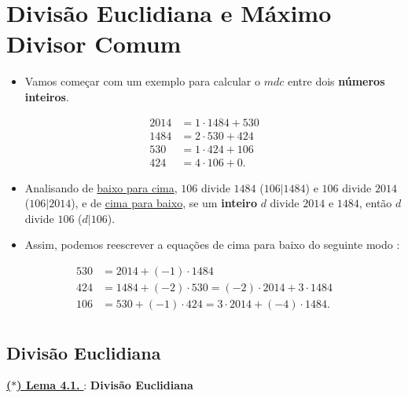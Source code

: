 \section{Divisão Euclidiana e Máximo Divisor Comum}

    \begin{itemize}[left=0.5cm, align=left, nosep]
        \item Vamos começar com um exemplo para calcular o $mdc$ entre dois \textbf{números inteiros}.  
    \end{itemize}

    \begin{exemplo}[: {$mdc(2014,1486) = 106$}]
    \[
    \begin{aligned}
        2014 &= 1 \cdot 1484 + 530 \\
        1484 &= 2 \cdot 530 + 424 \\
        530 &= 1 \cdot 424 + 106 \\
        424 &= 4 \cdot 106 + 0.
    \end{aligned}
    \]
    \end{exemplo}

    \begin{itemize}[left=0.5cm, align=left, nosep]
        \item Analisando de \underline{baixo para cima}, $106$ divide $1484$ ($106|1484$) e $106$ divide $2014$ 
        ($106|2014$), e de \underline{cima para baixo}, se um \textbf{inteiro} $d$ divide $2014$ e $1484$, então $d$ divide $106$ ($d|106$).
        \item Assim, podemos reescrever a equações de cima para baixo do seguinte modo :
    \end{itemize}

    \vspace{-1cm}
    \begin{align*}
        530 &= 2014 + (-1) \cdot 1484 \\
        424 &= 1484 + (-2) \cdot 530 = (-2) \cdot 2014 + 3 \cdot 1484 \\
        106 &= 530 + (-1) \cdot 424 = 3 \cdot 2014 + (-4) \cdot 1484. \\
    \end{align*}

    \subsection{Divisão Euclidiana}

        \underline{\underline{ \textbf{\textcolor{cinzaEscuro}{($\ast$) Lema 4.1.}} }} : \textbf{\textcolor{cinzaEscuro}{Divisão Euclidiana}}

